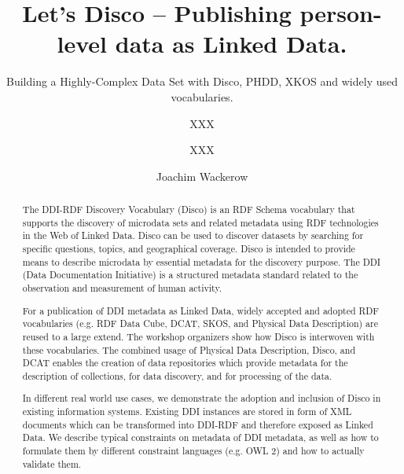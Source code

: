 \documentclass{llncs}
\begin{document}
%
%
\title{Let’s Disco – Publishing person-level data as Linked Data.}
\subtitle{Building a Highly-Complex Data Set with Disco, PHDD, XKOS and widely used vocabularies.
}
%
%
\author{XXX \and XXX \and Joachim Wackerow}
%
%

\maketitle              %

\begin{abstract}
The DDI-RDF Discovery Vocabulary (Disco) is an RDF Schema vocabulary that supports the discovery of microdata sets and related metadata using RDF technologies in the Web of Linked Data. Disco can be used to discover datasets by searching for specific questions, topics, and geographical coverage. Disco is intended to provide means to describe microdata by essential metadata for the discovery purpose.
 The DDI (Data Documentation Initiative) is a structured metadata standard related to the observation and measurement of human activity.

For a publication of DDI metadata as Linked Data, widely accepted and adopted RDF vocabularies (e.g. RDF Data Cube, DCAT, SKOS, and Physical Data Description) are reused to a large extend. 
The workshop organizers show how Disco is interwoven with these vocabularies. 
The combined usage of Physical Data Description, Disco, and DCAT enables the creation of data repositories which provide metadata for the description of collections, for data discovery, and for processing of the data.
 
In different real world use cases, we demonstrate the adoption and inclusion of Disco in existing information systems. 
Existing DDI instances are stored in form of XML documents which can be transformed into DDI-RDF and therefore exposed as Linked Data.
We describe typical constraints on metadata of DDI metadata, as well as how to formulate them by different constraint languages (e.g. OWL 2) and how to actually validate them.

\end{abstract}
%
\end{document}
